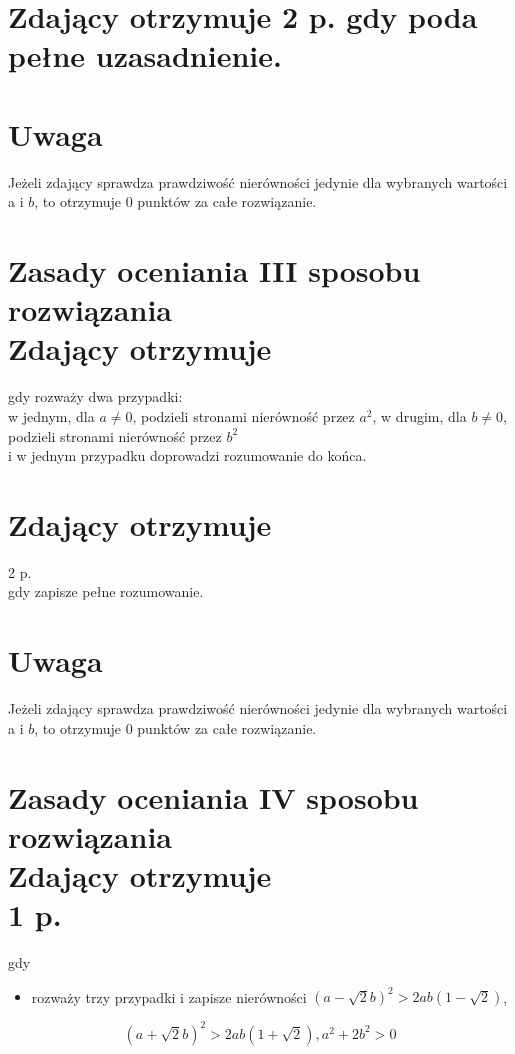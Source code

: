 \documentclass[10pt]{article}
\begin{document}
\section*{Zdający otrzymuje 2 p. gdy poda pełne uzasadnienie.}
\section*{Uwaga}
Jeżeli zdający sprawdza prawdziwość nierówności jedynie dla wybranych wartości a i $b$, to otrzymuje 0 punktów za całe rozwiązanie.

\section*{Zasady oceniania III sposobu rozwiązania \\
 Zdający otrzymuje}
gdy rozważy dwa przypadki:\\
w jednym, dla $a \neq 0$, podzieli stronami nierówność przez $a^{2}$, w drugim, dla $b \neq 0$, podzieli stronami nierówność przez $b^{2}$\\
i w jednym przypadku doprowadzi rozumowanie do końca.

\section*{Zdający otrzymuje}
2 p.\\
gdy zapisze pełne rozumowanie.

\section*{Uwaga}
Jeżeli zdający sprawdza prawdziwość nierówności jedynie dla wybranych wartości a i $b$, to otrzymuje 0 punktów za całe rozwiązanie.

\section*{Zasady oceniania IV sposobu rozwiązania \\
 Zdający otrzymuje \\
 1 p.}
gdy

\begin{itemize}
  \item rozważy trzy przypadki i zapisze nierówności $(a-\sqrt{2} b)^{2}>2 a b(1-\sqrt{2})$,
\end{itemize}

$$
(a+\sqrt{2} b)^{2}>2 a b(1+\sqrt{2}), a^{2}+2 b^{2}>0
$$
\end{document}
